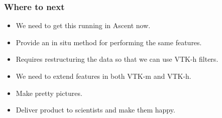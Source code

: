 \documentclass[pdf,8pt]{beamer}
\begin{document}
\begin{frame}
\frametitle{Where to next}
    \begin{itemize}
        \item We need to get this running in Ascent now.
        \item Provide an in situ method for performing the same features.
        \item Requires restructuring the data so that we can use VTK-h filters.
        \item We need to extend features in both VTK-m and VTK-h.
        \item Make pretty pictures.
        \item Deliver product to scientists and make them happy.
    \end{itemize}
\end{frame}
\end{document}
